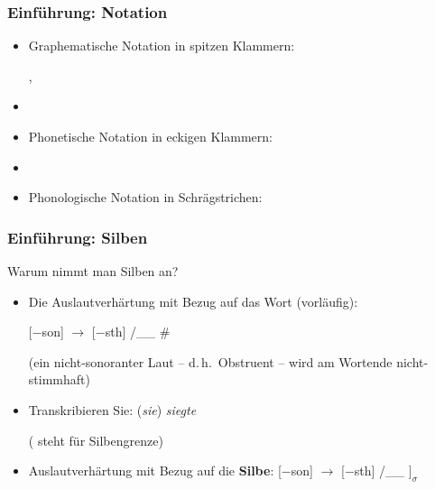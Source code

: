 


\begin{frame}
\frametitle{Einführung: Notation}


\begin{itemize}
	\item Graphematische Notation in spitzen Klammern: 
	
	  \ea
          , 
          \z
          
	\item[]	
	\item Phonetische Notation in eckigen Klammern:
	
	  \ea
          \textipa{[nO5t.vInt]}
	  \z
          
	\item[]
	\item Phonologische Notation in Schrägstrichen:
	
	  \ea
	  \z
\end{itemize}

\end{frame}



\begin{frame}
\frametitle{Einführung: Silben}


Warum nimmt man Silben an?

\begin{itemize}
	\item Die Auslautverhärtung mit Bezug auf das Wort (vorläufig):
	
	  \ea
             {}[$-$son] $\rightarrow$ [$-$sth] /\_\_ \#
	     \z
	     
	{\small (ein nicht-sonoranter Laut -- d.\,h.\ Obstruent -- wird am Wortende nicht-stimmhaft)}
	
	     
	\item Transkribieren Sie: (\emph{sie}) \emph{siegte}

\pause	
\ea
\textipa{[zi:k . t@]} ( steht für Silbengrenze)
\z

\pause
	\eal 
	\ex \textipa{[St\textscr e:p.za:m]} \vs \textipa{[St\textscr e:.b5]}
	\ex {} \vs \textipa{[bUn.d@s]}
	\ex \textipa{[bi:k.za:m]} \vs \textipa{[bi:.g@n]}
	\ex \textipa{[le:s.b5]} \vs \textipa{[le:.z@n]}
        \zl
        
	\item Auslautverhärtung mit Bezug auf die \textbf{Silbe}:
	  \ea
             {}[$-$son] $\rightarrow$ [$-$sth] /\_\_ $]_{\sigma}$
	  \z	
\end{itemize}


\end{frame}



